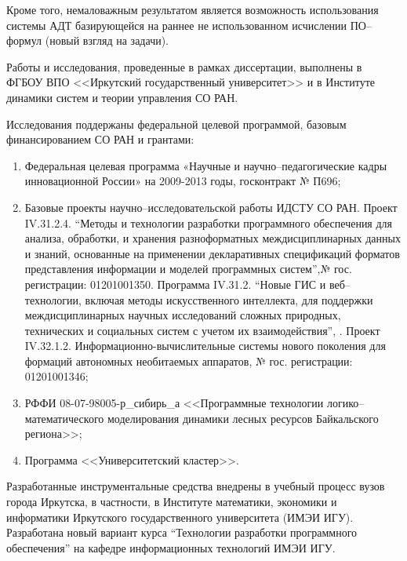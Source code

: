 Кроме того, немаловажным результатом является возможность использования системы АДТ базирующейся на раннее не использованном исчислении ПО--формул (новый взгляд на задачи).

Работы и исследования, проведенные в рамках  диссертации, выполнены в ФГБОУ ВПО <<Иркутский государственный университет>> и в Институте динамики систем и теории управления СО РАН.

Исследования поддержаны федеральной целевой программой, базовым финансированием СО РАН и грантами:
\begin{enumerate}
\item Федеральная целевая программа «Научные и научно--педагогические кадры инновационной России» на 2009-2013 годы, госконтракт № П696;
\item Базовые проекты научно--исследовательской работы ИДСТУ СО РАН. Проект IV.31.2.4. ``Методы и технологии разработки программного обеспечения для анализа, обработки, и хранения разноформатных междисциплинарных данных и знаний, основанные на применении декларативных спецификаций форматов представления информации и моделей программных систем'',№ гос. регистрации: 01201001350. Программа IV.31.2. ``Новые ГИС и веб--технологии, включая методы искусственного интеллекта, для поддержки междисциплинарных научных исследований сложных природных, технических и социальных систем с учетом их взаимодействия'', . Проект IV.32.1.2. Информационно-вычислительные системы нового поколения для формаций автономных необитаемых аппаратов, № гос. регистрации: 01201001346;
\item РФФИ 08-07-98005-р\_сибирь\_а <<Программные технологии логико--математического моделирования динамики лесных ресурсов Байкальского региона>>;
\item Программа <<Университетский кластер>>.
\end{enumerate}

Разработанные инструментальные средства внедрены в учебный процесс вузов города Иркутска, в частности, в Институте математики, экономики и информатики Иркутского государственного университета (ИМЭИ ИГУ). Разработана новый вариант курса ``Технологии разработки программного обеспечения'' на кафедре информационных технологий ИМЭИ ИГУ.

